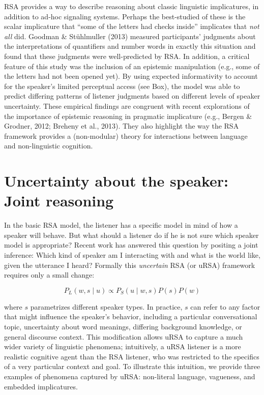 \documentclass[]{elsarticle}
\begin{document}
RSA provides a way to describe reasoning about classic linguistic
implicatures, in addition to ad-hoc signaling systems. Perhaps the
best-studied of these is the scalar implicature that ``some of the
letters had checks inside'' implicates that \emph{not all} did. Goodman
\& Stühlmuller (2013) measured participants' judgments about the
interpretations of quantifiers and number words in exactly this
situation and found that these judgments were well-predicted by RSA. In
addition, a critical feature of this study was the inclusion of an
epistemic manipulation (e.g., some of the letters had not been opened
yet). By using expected informativity to account for the speaker's
limited perceptual access (see Box), the model was able to predict
differing patterns of listener judgments based on different levels of
speaker uncertainty. These empirical findings are congruent with recent
explorations of the importance of epistemic reasoning in pragmatic
implicature (e.g., Bergen \& Grodner, 2012; Breheny et al., 2013). They
also highlight the way the RSA framework provides a (non-modular) theory
for interactions between language and non-linguistic cognition.

\section{Uncertainty about the speaker: Joint reasoning}\label{uncertainty-about-the-speaker-joint-reasoning}

In the basic RSA model, the listener has a specific model in mind of how
a speaker will behave. But what should a listener do if he is not sure
which speaker model is appropriate? Recent work has answered this
question by positing a joint inference: Which kind of speaker am I
interacting with and what is the world like, given the utterance I
heard? Formally this \emph{uncertain} RSA (or uRSA) framework requires
only a small change:

$$P_L(w,s\mid u) \propto
P_S(u\mid w,s)P(s)P(w)$$

where $s$ parametrizes different speaker types. In practice, $s$ can
refer to any factor that might influence the speaker's behavior,
including a particular conversational topic, uncertainty about word
meanings, differing background knowledge, or general discourse context.
This modification allows uRSA to capture a much wider variety of
linguistic phenomena; intuitively, a uRSA listener is a more realistic
cognitive agent than the RSA listener, who was restricted to the
specifics of a very particular context and goal. To illustrate this
intuition, we provide three examples of phenomena captured by uRSA:
non-literal language, vagueness, and embedded implicatures.
\end{document}
